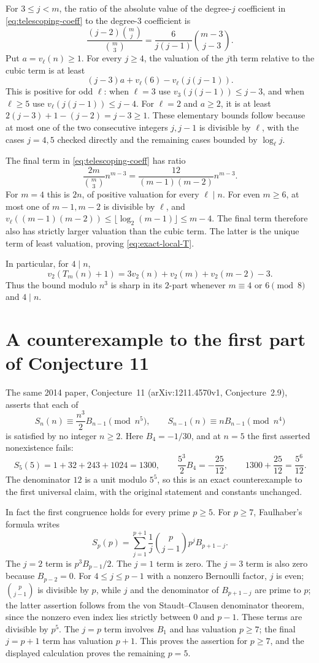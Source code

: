 \documentclass[11pt,a4paper]{article}
\theoremstyle{definition}
\theoremstyle{remark}
\begin{document}
For $3\le j<m$, the ratio of the absolute value of the degree-$j$
coefficient in \eqref{eq:telescoping-coeff} to the degree-$3$ coefficient
is
\[
 \frac{(j-2)\binom mj}{\binom m3}
 =\frac{6}{j(j-1)}\binom{m-3}{j-3}.
\]
Put $a=v_\ell(n)\ge1$.
For every $j\ge4$, the valuation of the $j$th term relative to the
cubic term is at least
\[
 (j-3)a+v_\ell(6)-v_\ell(j(j-1)).
\]
This is positive for odd $\ell$: when $\ell=3$ use
$v_3(j(j-1))\le j-3$, and when $\ell\ge5$ use
$v_\ell(j(j-1))\le j-4$.
For $\ell=2$ and $a\ge2$, it is at least
$2(j-3)+1-(j-2)=j-3\ge1$.
These elementary bounds follow because at most one of the two consecutive
integers $j,j-1$ is divisible by $\ell$, with the cases $j=4,5$
checked directly and the remaining cases bounded by $\log_\ell j$.

The final term in \eqref{eq:telescoping-coeff} has ratio
\[
 \frac{2m}{\binom m3}n^{m-3}
 =\frac{12}{(m-1)(m-2)}n^{m-3}.
\]
For $m=4$ this is $2n$, of positive valuation for every $\ell\mid n$.
For even $m\ge6$, at most one of $m-1,m-2$ is divisible by $\ell$,
and
$v_\ell((m-1)(m-2))\le\lfloor\log_2(m-1)\rfloor\le m-4$.
The final term therefore also has strictly larger valuation than the
cubic term.  The latter is the unique term of least valuation, proving
\eqref{eq:exact-local-T}.

In particular, for $4\mid n$,
\[
 v_2(T_m(n)+1)
 =3v_2(n)+v_2(m)+v_2(m-2)-3.
\]
Thus the bound modulo $n^3$ is sharp in its $2$-part whenever
$m\equiv4$ or $6\pmod8$ and $4\mid n$.

\section{A counterexample to the first part of Conjecture 11}

The same 2014 paper, Conjecture~11 \cite{Mestrovic2014sums} (arXiv:1211.4570v1,
Conjecture~2.9), asserts that each of
\[
 S_n(n)\equiv\frac{n^3}{2}B_{n-1}\pmod{n^5},\qquad
 S_{n-1}(n)\equiv nB_{n-1}\pmod{n^4}
\]
is satisfied by no integer $n\ge2$.
Here $B_4=-1/30$, and at $n=5$ the first asserted nonexistence fails:
\[
 S_5(5)=1+32+243+1024=1300,\qquad
 \frac{5^3}{2}B_4=-\frac{25}{12},\qquad
 1300+\frac{25}{12}=\frac{5^6}{12}.
\]
The denominator $12$ is a unit modulo $5^5$, so this is an exact
counterexample to the first universal claim, with the original
statement and constants unchanged.

In fact the first congruence holds for every prime $p\ge5$.
For $p\ge7$, Faulhaber's formula writes
\[
 S_p(p)=\sum_{j=1}^{p+1}\frac1j\binom p{j-1}p^jB_{p+1-j}.
\]
The $j=2$ term is $p^3B_{p-1}/2$.  The $j=1$ term is zero.  The $j=3$ term is also zero because $B_{p-2}=0$.
For $4\le j\le p-1$ with a nonzero Bernoulli factor, $j$ is even;
$\binom p{j-1}$ is divisible by $p$, while $j$ and the denominator
of $B_{p+1-j}$ are prime to $p$; the latter assertion follows from the
von Staudt--Clausen denominator theorem, since the nonzero even index
lies strictly between $0$ and $p-1$.  These terms are divisible by $p^5$.
The $j=p$ term involves $B_1$ and has valuation $p\ge7$; the final
$j=p+1$ term has valuation $p+1$.  This proves the assertion for
$p\ge7$, and the displayed calculation proves the remaining $p=5$.
\end{document}
